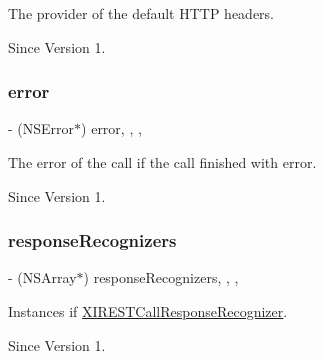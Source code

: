The provider of the default H\+T\+TP headers. 

\begin{DoxySince}{Since}
Version 1. 
\end{DoxySince}
\hypertarget{category_x_i_simple_r_e_s_t_call_07_08_a6f1a442876e355a9b79fdfdba78cadf8}{}\label{category_x_i_simple_r_e_s_t_call_07_08_a6f1a442876e355a9b79fdfdba78cadf8} 
\subsubsection{\texorpdfstring{error}{error}}
{\footnotesize\ttfamily -\/ (N\+S\+Error$\ast$) error\hspace{0.3cm}{\ttfamily [read]}, {\ttfamily [write]}, {\ttfamily [nonatomic]}, {\ttfamily [strong]}}



The error of the call if the call finished with error. 

\begin{DoxySince}{Since}
Version 1. 
\end{DoxySince}
\hypertarget{category_x_i_simple_r_e_s_t_call_07_08_a3e5908b5178dc6f0813437222e67dd22}{}\label{category_x_i_simple_r_e_s_t_call_07_08_a3e5908b5178dc6f0813437222e67dd22} 
\subsubsection{\texorpdfstring{response\+Recognizers}{responseRecognizers}}
{\footnotesize\ttfamily -\/ (N\+S\+Array$\ast$) response\+Recognizers\hspace{0.3cm}{\ttfamily [read]}, {\ttfamily [write]}, {\ttfamily [nonatomic]}, {\ttfamily [strong]}}



Instances if \hyperlink{}{X\+I\+R\+E\+S\+T\+Call\+Response\+Recognizer}. 

\begin{DoxySince}{Since}
Version 1. 
\end{DoxySince}
\hypertarget{category_x_i_simple_r_e_s_t_call_07_08_af4144cce1ed9a24c994cb158e0fdec58}{}\label{category_x_i_simple_r_e_s_t_call_07_08_af4144cce1ed9a24c994cb158e0fdec58} 
